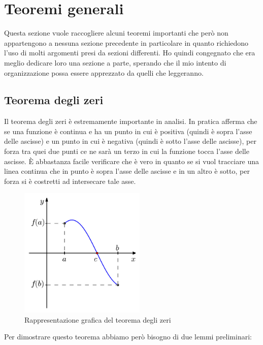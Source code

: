 \section{Teoremi generali}
Questa sezione vuole raccogliere alcuni teoremi importanti che però non 
appartengono a nessuna sezione precedente in particolare in quanto richiedono 
l'uso di molti argomenti presi da sezioni differenti. Ho quindi congegnato che 
era meglio dedicare loro una sezione a parte, sperando che il mio intento di 
organizzazione possa essere apprezzato da quelli che leggeranno.

\subsection{Teorema degli zeri}
Il teorema degli zeri è estremamente importante in analisi. In pratica afferma 
che se una funzione è continua e ha un punto in cui è positiva (quindi è sopra 
l'asse delle ascisse) e un punto in cui è negativa (quindi è sotto l'asse delle 
ascisse), per forza tra quei due punti ce ne sarà un terzo in cui la funzione 
tocca l'asse delle ascisse. È abbastanza facile verificare che è vero in quanto 
se si vuol tracciare una linea continua che in punto è sopra l'asse delle 
ascisse e in un altro è sotto, per forza si è costretti ad intersecare tale 
asse.
\begin{figure}[h]
    \centering
	\includegraphics[width=6cm]{../img/TeoremaZeri.jpg}
    \caption{Rappresentazione grafica del teorema degli zeri}
\end{figure}
Per dimostrare questo teorema abbiamo però bisogno di due lemmi preliminari:

